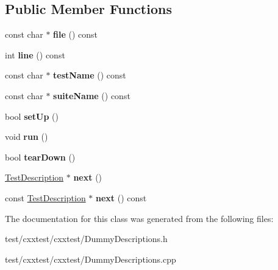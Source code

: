\subsection*{Public Member Functions}
\begin{DoxyCompactItemize}
\item 
\hypertarget{classCxxTest_1_1DummyTestDescription_a21005169bb72663e407b45eb27dff403}{const char $\ast$ {\bfseries file} () const }\label{classCxxTest_1_1DummyTestDescription_a21005169bb72663e407b45eb27dff403}

\item 
\hypertarget{classCxxTest_1_1DummyTestDescription_a154f960c20e234070ae79d033d49a0fa}{int {\bfseries line} () const }\label{classCxxTest_1_1DummyTestDescription_a154f960c20e234070ae79d033d49a0fa}

\item 
\hypertarget{classCxxTest_1_1DummyTestDescription_a1798b906914210b3a5c39b1980446703}{const char $\ast$ {\bfseries test\-Name} () const }\label{classCxxTest_1_1DummyTestDescription_a1798b906914210b3a5c39b1980446703}

\item 
\hypertarget{classCxxTest_1_1DummyTestDescription_a672c8c42e2ca9457f376ae5d4c3403b0}{const char $\ast$ {\bfseries suite\-Name} () const }\label{classCxxTest_1_1DummyTestDescription_a672c8c42e2ca9457f376ae5d4c3403b0}

\item 
\hypertarget{classCxxTest_1_1DummyTestDescription_a24f9066548e0d6376ff91467af2aff3a}{bool {\bfseries set\-Up} ()}\label{classCxxTest_1_1DummyTestDescription_a24f9066548e0d6376ff91467af2aff3a}

\item 
\hypertarget{classCxxTest_1_1DummyTestDescription_a8a15205feb0a0f433fd7207e7039cb7a}{void {\bfseries run} ()}\label{classCxxTest_1_1DummyTestDescription_a8a15205feb0a0f433fd7207e7039cb7a}

\item 
\hypertarget{classCxxTest_1_1DummyTestDescription_a89914791c85021c2612a29fbe57a7f99}{bool {\bfseries tear\-Down} ()}\label{classCxxTest_1_1DummyTestDescription_a89914791c85021c2612a29fbe57a7f99}

\item 
\hypertarget{classCxxTest_1_1DummyTestDescription_ac4318fa14c5daff130c272db0331c15f}{\hyperlink{classCxxTest_1_1TestDescription}{Test\-Description} $\ast$ {\bfseries next} ()}\label{classCxxTest_1_1DummyTestDescription_ac4318fa14c5daff130c272db0331c15f}

\item 
\hypertarget{classCxxTest_1_1DummyTestDescription_a5bbce0a879115d14cecec9ef2cbb8dc1}{const \hyperlink{classCxxTest_1_1TestDescription}{Test\-Description} $\ast$ {\bfseries next} () const }\label{classCxxTest_1_1DummyTestDescription_a5bbce0a879115d14cecec9ef2cbb8dc1}

\end{DoxyCompactItemize}


The documentation for this class was generated from the following files\-:\begin{DoxyCompactItemize}
\item 
test/cxxtest/cxxtest/Dummy\-Descriptions.\-h\item 
test/cxxtest/cxxtest/Dummy\-Descriptions.\-cpp\end{DoxyCompactItemize}
